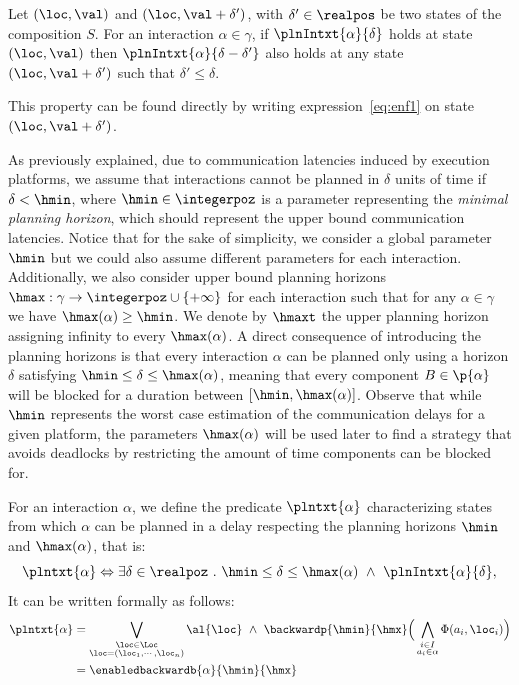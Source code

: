 \begin{property}\label{pt:plnIn2}
Let $(\loc,\val)$ and $(\loc,\val+\delta')$, with $\delta'\in\realpos$ be two states of 
the composition $S$. For an interaction $\alpha\in\gamma$, if $\plnIntxt{\alpha}{\delta}$ 
holds at state $(\loc,\val)$ then $\plnIntxt{\alpha}{\delta-\delta'}$ 
also holds at any state $(\loc,\val+\delta')$ such that $\delta'\le\delta$.
\end{property}
This property can be found directly by writing expression~\ref{eq:enf1} on state 
$(\loc,\val+\delta')$.

As previously explained, due to communication latencies induced by execution platforms, 
we assume that interactions cannot be planned in $\delta$ units of time if $\delta < \hmin$, 
where $\hmin \in \integerpoz$ is a parameter representing the \emph{minimal planning horizon}, 
which should represent the upper bound communication latencies.
Notice that for the sake of simplicity, we consider a global parameter $\hmin$ but 
we could also assume different parameters for each interaction.
Additionally, we also consider upper bound planning horizons 
$\hmax : \gamma \to \integerpoz\cup\{ +\infty \}$ 
for each interaction such that for any $\alpha\in\gamma$ we have $\hmax(\alpha) \geq \hmin$.
We denote by $\hmaxt$ the upper planning horizon assigning infinity to every $\hmax(\alpha)$.
A direct consequence of introducing the planning horizons is that every interaction $\alpha$ 
can be planned only using a horizon $\delta$ satisfying $\hmin \leq \delta \leq \hmax(\alpha)$,
meaning that every component $B\in\p{\alpha}$ will be blocked for a duration between
$[\hmin,\hmax(\alpha)]$. Observe that while $\hmin$ represents the worst case estimation of the 
communication delays for a given platform, the parameters $\hmax(\alpha)$ will be used later 
to find a strategy that avoids deadlocks by restricting the amount of time components 
can be blocked for.

For an interaction $\alpha$, we define the predicate $\plntxt{\alpha}$ 
characterizing states from which $\alpha$ can be planned in a delay respecting 
the planning horizons $\hmin$ and $\hmax(\alpha)$, that is:
\begin{displaymath}
\plntxt{\alpha}\Leftrightarrow\exists\delta\in\realpoz\ .\ \hmin\leq\delta\leq\hmax(\alpha)\ 
  \wedge\ \plnIntxt{\alpha}{\delta},
\end{displaymath}
It can be written formally as follows:
\begin{align}\label{eq:pln}
 \plntxt{\alpha}&=\bigvee_{\substack{\loc\in\Loc\\\loc=(\loc_1,\cdots,\loc_n)}}\al{\loc}\ \wedge\
  \backwardp{\hmin}{\hmx} \Big(\bigwedge_{\substack{i\in I\\a_i\in\alpha}}\Phi(a_i,\loc_i)\Big)\\
                &=\enabledbackwardb{\alpha}{\hmin}{\hmx}
\end{align}

